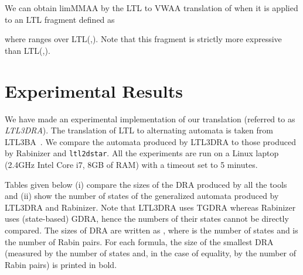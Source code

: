 \documentclass{llncs}
\begin{document}
We can obtain limMMAA by the LTL to VWAA translation of \cite{GO01} when it
is applied to an LTL fragment defined as

where  ranges over LTL(,). Note that this fragment is
strictly more expressive than LTL(,).





\section{Experimental Results}
\label{sec:experiments}
We have made an experimental implementation of our translation (referred to
as \emph{LTL3DRA}). The translation of LTL to alternating automata is taken
from LTL3BA~\cite{BKRS12}.  We compare the automata produced
by LTL3DRA to those produced by Rabinizer and \texttt{ltl2dstar}. All the
experiments are run on a Linux laptop (2.4GHz Intel Core i7, 8GB of RAM)
with a timeout set to 5 minutes.

Tables given below (i) compare the sizes of the DRA produced by all the
tools and (ii) show the number of states of the generalized automata
produced by LTL3DRA and Rabinizer. Note that LTL3DRA uses TGDRA
whereas Rabinizer uses (state-based) GDRA,
hence the numbers of their states cannot be
directly compared. The sizes of DRA are written as , where  is the
number of states and  is the number of Rabin pairs.  For each formula,
the size of the smallest DRA (measured by the number of states and, in the
case of equality, by the number of Rabin pairs) is printed in bold.
\end{document}
